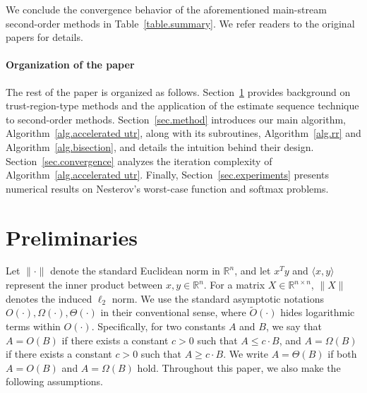 \documentclass{article}
\begin{document}
We conclude the convergence behavior of the aforementioned main-stream second-order methods in Table~\ref{table.summary}. We refer readers to the original papers for details.

\paragraph{Organization of the paper}
The rest of the paper is organized as follows. Section~\ref{sec.priliminary} provides background on trust-region-type methods and the application of the estimate sequence technique to second-order methods. Section~\ref{sec.method} introduces our main algorithm, Algorithm~\ref{alg.accelerated utr}, along with its subroutines, Algorithm~\ref{alg.rr} and Algorithm~\ref{alg.bisection}, and details the intuition behind their design. Section~\ref{sec.convergence} analyzes the iteration complexity of Algorithm~\ref{alg.accelerated utr}. Finally, Section~\ref{sec.experiments} presents numerical results on Nesterov’s worst-case function and softmax problems.

\section{Preliminaries}
\label{sec.priliminary}
Let $\|\cdot\|$ denote the standard Euclidean norm in $\mathbb{R}^n$, and let $x^T y$ and $\langle x,y\rangle$ represent the inner product between $x, y \in \mathbb{R}^n$. For a matrix $X \in \mathbb{R}^{n \times n}$, $\|X\|$ denotes the induced $\ell_2$ norm. We use the standard asymptotic notations $O(\cdot), \Omega(\cdot), \Theta(\cdot)$ in their conventional sense, where $\tilde{O}(\cdot)$ hides logarithmic terms within $O(\cdot)$. Specifically, for two constants $A$ and $B$, we say that $A = O(B)$ if there exists a constant $c > 0$ such that $A \leq c \cdot B$, and $A = \Omega(B)$ if there exists a constant $c > 0$ such that $A \geq c \cdot B$. We write $A = \Theta(B)$ if both $A = O(B)$ and $A = \Omega(B)$ hold.
Throughout this paper, we also make the following assumptions. 


\end{document}
